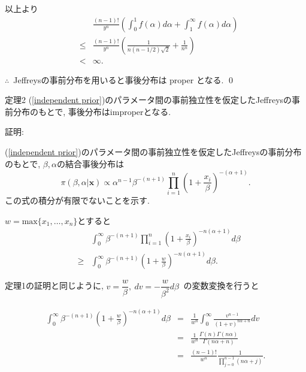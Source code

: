 \documentclass[12pt,dvipdfmx]{beamer}
\begin{document}
\begin{frame}
以上より
\begin{eqnarray*}
&&
\frac{(n-1)!}{y^{n}}\left(
\int_{0}^{1}f(\alpha )d\alpha + \int_{1}^{\infty}f(\alpha )d\alpha
\right) \\
&\leq &
\frac{(n-1)!}{y^{n}}\left(
\frac{1}{n(n-1/2)\sqrt{2}} + \frac{1}{n^{n}}
\right) \\
&<&
\infty.
\end{eqnarray*}

$\therefore$~Jeffreysの事前分布を用いると事後分布は proper となる. \qed


\end{frame}


\begin{frame}
\begin{block}{定理2}
(\ref{independent prior})のパラメータ間の事前独立性を仮定したJeffreysの事前分布のもとで, 事後分布はimproperとなる. 
\end{block}

証明:

(\ref{independent prior})のパラメータ間の事前独立性を仮定したJeffreysの事前分布のもとで, $\beta ,\alpha $の結合事後分布は
$$
\pi(\beta ,\alpha |\bm{x})
\propto
\alpha^{n-1}\beta ^{-(n+1)}
\prod_{i=1}^{n}
\left(1+\frac{x_{i}}{\beta }
\right)^{-(\alpha +1)}. 
$$
この式の積分が有限でないことを示す. 
\end{frame}




\begin{frame}

$w=\mbox{max}\{x_1,\ldots,x_n\}$とすると
\begin{eqnarray*}
&&
\int_0^\infty \beta ^{-(n+1)}\prod_{i=1}^n
\left(1+\frac{x_i}{\beta }\right)^{-n(\alpha +1)}d\beta \\
&\geq&
\int_0^\infty \beta ^{-(n+1)}
\left(1+\frac{w}{\beta }\right)^{-n(\alpha +1)}d\beta.
\end{eqnarray*}


定理1の証明と同じように, $v=\dfrac{w}{\beta },~dv=-\dfrac{w}{\beta ^{2}}d\beta ~$
の変数変換を行うと

\end{frame}


\begin{frame}


\begin{eqnarray*}
\int_{0}^{\infty}\beta ^{-(n+1)}
\left(1+\frac{w}{\beta }\right)^{-n(\alpha +1)}d\beta 
&=&
\frac{1}{w^{n}}\int_{0}^{\infty}\frac{v^{n-1}}{(1+v)^{n\alpha +n}}dv \\
&=&
\frac{1}{w^{n}}\frac{\Gamma (n)\Gamma(n\alpha )}{\Gamma (n\alpha +n)} \\
&=&
\frac{(n-1)!}{w^{n}}\frac{1}{\prod_{j=0}^{n-1}(n\alpha +j)}.
\end{eqnarray*}


\end{frame}
\end{document}
